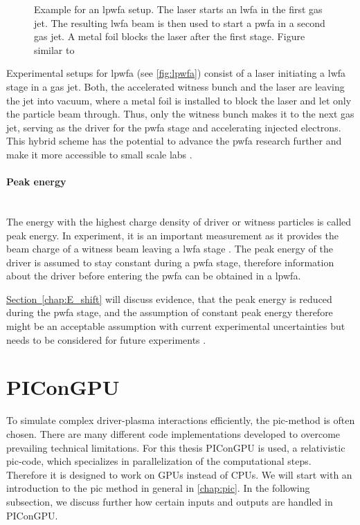\documentclass[bachelor_thesis]{subfiles}
\begin{document}
\begin{figure}
	\centering
	
	\caption{Example for an \gls{lpwfa} setup. The laser starts an \gls{lwfa} in the first gas jet. The resulting \gls{lwfa} beam is then used to start a \gls{pwfa} in a second gas jet. A metal foil blocks the laser after the first stage. Figure similar to \cite{Ossa2019}}
	\label{fig:lpwfa}
\end{figure} 
Experimental setups for \gls{lpwfa} (see \autoref{fig:lpwfa}) consist of a laser initiating a \gls{lwfa} stage in a gas jet. 
Both, the accelerated witness bunch and the laser are leaving the jet into vacuum, where a metal foil is installed to block the laser and let only the particle beam through. 
Thus, only the witness bunch makes it to the next gas jet, serving as the driver for the \gls{pwfa} stage and accelerating injected electrons.
This hybrid scheme has the potential to advance the \gls{pwfa} research further and make it more accessible to small scale labs \cite{Kurz2021}.

\paragraph*{Peak energy}\hspace{0pt} \\
The energy with the highest charge density of driver or witness particles is called peak energy. In experiment, it is an important measurement as it provides the beam charge of a witness beam leaving a \gls{lwfa} stage \cite{Schoebel2022}.
The peak energy of the driver is assumed to stay constant during a \gls{pwfa} stage, therefore information about the driver before entering the \gls{pwfa} can be obtained in a \gls{lpwfa}.

\hyperref[chap:E_shift]{Section~\ref*{chap:E_shift}} will discuss evidence, that the peak energy is reduced during the \gls{pwfa} stage, and the assumption of constant peak energy therefore might be an acceptable assumption 
with current experimental uncertainties but needs to be considered for future experiments .


\section{PIConGPU}
To simulate complex driver-plasma interactions efficiently, the \acrfull{pic}-method is often chosen. There are many different code implementations developed to overcome prevailing technical limitations. For this thesis PIConGPU \cite{PIConGPU2013, PICRepo} is used, 
a relativistic \gls{pic}-code, which specializes in parallelization of the computational steps. Therefore it is designed to work on GPUs instead of CPUs. We will start with an introduction to the \gls{pic} method in general in \autoref{chap:pic}.
In the following subsection, we discuss further how certain inputs and outputs are handled in PIConGPU.
\end{document}
